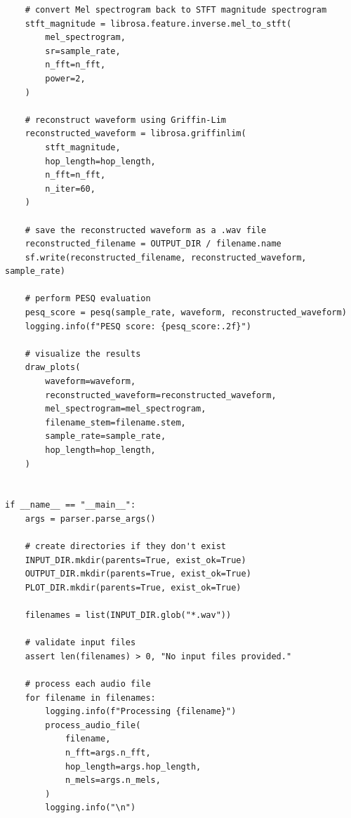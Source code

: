 \documentclass{article}
\begin{document}
\begin{lstlisting}
    # convert Mel spectrogram back to STFT magnitude spectrogram
    stft_magnitude = librosa.feature.inverse.mel_to_stft(
        mel_spectrogram,
        sr=sample_rate,
        n_fft=n_fft,
        power=2,
    )

    # reconstruct waveform using Griffin-Lim
    reconstructed_waveform = librosa.griffinlim(
        stft_magnitude,
        hop_length=hop_length,
        n_fft=n_fft,
        n_iter=60,
    )

    # save the reconstructed waveform as a .wav file
    reconstructed_filename = OUTPUT_DIR / filename.name
    sf.write(reconstructed_filename, reconstructed_waveform, sample_rate)

    # perform PESQ evaluation
    pesq_score = pesq(sample_rate, waveform, reconstructed_waveform)
    logging.info(f"PESQ score: {pesq_score:.2f}")

    # visualize the results
    draw_plots(
        waveform=waveform,
        reconstructed_waveform=reconstructed_waveform,
        mel_spectrogram=mel_spectrogram,
        filename_stem=filename.stem,
        sample_rate=sample_rate,
        hop_length=hop_length,
    )


if __name__ == "__main__":
    args = parser.parse_args()

    # create directories if they don't exist
    INPUT_DIR.mkdir(parents=True, exist_ok=True)
    OUTPUT_DIR.mkdir(parents=True, exist_ok=True)
    PLOT_DIR.mkdir(parents=True, exist_ok=True)

    filenames = list(INPUT_DIR.glob("*.wav"))

    # validate input files
    assert len(filenames) > 0, "No input files provided."

    # process each audio file
    for filename in filenames:
        logging.info(f"Processing {filename}")
        process_audio_file(
            filename,
            n_fft=args.n_fft,
            hop_length=args.hop_length,
            n_mels=args.n_mels,
        )
        logging.info("\n")
\end{lstlisting}
\end{document}
